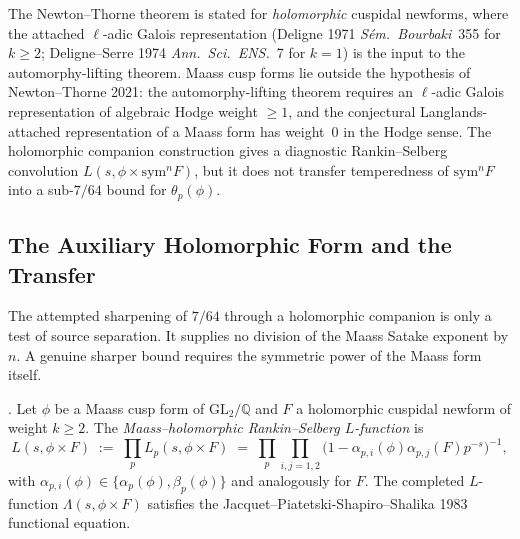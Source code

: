 \begin{remark}
\label{v4-arith:w10-c:rem:NT-domain}
The Newton--Thorne theorem is stated for \emph{holomorphic} cuspidal
newforms, where the attached \(\ell\)-adic Galois representation
(Deligne 1971 \emph{S\'em.~Bourbaki}~355 for \(k\geq 2\); Deligne--Serre
1974 \emph{Ann.~Sci.~ENS.}~7 for \(k=1\)) is the input to the
automorphy-lifting theorem. Maass cusp forms lie outside the hypothesis of Newton--Thorne 2021:
the automorphy-lifting theorem requires an \(\ell\)-adic Galois representation
of algebraic Hodge weight \(\geq 1\), and the conjectural Langlands-attached
representation of a Maass form has weight~\(0\) in the Hodge sense.
The holomorphic companion construction gives a diagnostic
Rankin--Selberg convolution \(L(s,\phi\times\mathrm{sym}^{n}F)\), but it
does not transfer temperedness of \(\mathrm{sym}^{n}F\) into a
sub-\(7/64\) bound for \(\theta_{p}(\phi)\).
\end{remark}

\subsection{The Auxiliary Holomorphic Form and the Transfer}
\label{v4-arith:w10-c:construction-C:aux}

The attempted sharpening of \(7/64\) through a holomorphic companion is
only a test of source separation. It supplies no division of the Maass
Satake exponent by \(n\). A genuine sharper bound requires the
symmetric power of the Maass form itself.

\begin{definition}
\label{v4-arith:w10-c:def:MH-RS}
\ClaimStatusDefinitional. Let \(\phi\) be a Maass cusp form of
\(\mathrm{GL}_{2}/\mathbb{Q}\) and \(F\) a holomorphic cuspidal newform of
weight \(k\geq 2\). The \emph{Maass--holomorphic Rankin--Selberg
\(L\)-function} is
\begin{equation}
\label{v4-arith:w10-c:eq:MH-RS}
L(s,\phi\times F)
\;:=\;\prod_{p}L_{p}(s,\phi\times F)
\;=\;\prod_{p}\prod_{i,j=1,2}\bigl(1-\alpha_{p,i}(\phi)\alpha_{p,j}(F)p^{-s}\bigr)^{-1},
\end{equation}
with \(\alpha_{p,i}(\phi)\in\{\alpha_{p}(\phi),\beta_{p}(\phi)\}\) and
analogously for \(F\). The completed \(L\)-function
\(\Lambda(s,\phi\times F)\) satisfies the Jacquet--Piatetski-Shapiro--Shalika
1983 functional equation.
\end{definition}

